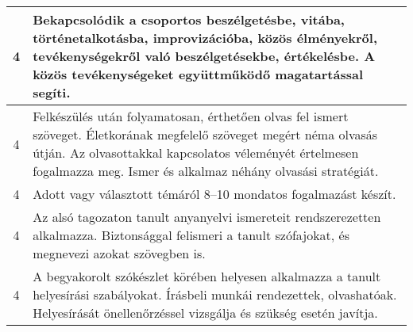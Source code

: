 \begin{longtable}{c | p{12cm} }
                                
                                          4 &  Bekapcsolódik a csoportos beszélgetésbe, vitába, történetalkotásba, improvizációba, közös élményekről, tevékenységekről való beszélgetésekbe, értékelésbe. A közös tevékenységeket együttműködő magatartással segíti. \\ \hline
                                          4 &  Felkészülés után folyamatosan, érthetően olvas fel ismert szöveget. Életkorának megfelelő szöveget megért néma olvasás útján. Az olvasottakkal kapcsolatos véleményét értelmesen fogalmazza meg. Ismer és alkalmaz néhány olvasási stratégiát. \\ \hline
                                          4 &  Adott vagy választott témáról 8–10 mondatos fogalmazást készít. \\ \hline
                                          4 &  Az alsó tagozaton tanult anyanyelvi ismereteit rendszerezetten alkalmazza. Biztonsággal felismeri a tanult szófajokat, és megnevezi azokat szövegben is. \\ \hline
                                          4 &  A begyakorolt szókészlet körében helyesen alkalmazza a tanult helyesírási szabályokat. Írásbeli munkái rendezettek, olvashatóak. Helyesírását önellenőrzéssel vizsgálja és szükség esetén javítja. \\ \hline
                                      
                        \end{longtable}
            \clearpage

